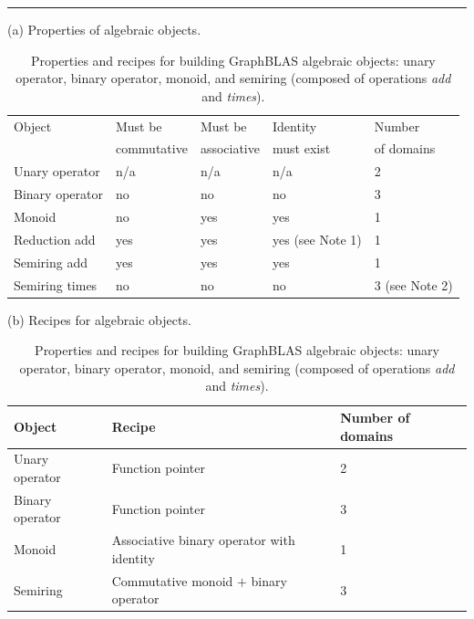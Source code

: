 
\begin{table}
    \hrule
    \begin{center}
        \caption{Properties and recipes for building GraphBLAS algebraic objects: unary operator, binary operator, monoid, and semiring (composed of operations \emph{add} and \emph{times}).}
        \label{Tab:AlgebraicObjects}
        
        \vspace{1\baselineskip}
        (a) Properties of algebraic objects.
        \vspace{1\baselineskip}
        
        \begin{tabular}{l|l|l|l|l}
            Object          & Must be       & Must be        & Identity         & Number \\
                            & commutative   & associative    & must exist       & of domains  \\
            \hline
            Unary operator  & n/a           & n/a            & n/a              & 2  \\
            Binary operator & no            & no             & no               & 3  \\
            Monoid          & no            & yes            & yes              & 1  \\
            Reduction add   & yes           & yes            & yes (see Note 1) & 1  \\
            Semiring add    & yes           & yes            & yes              & 1  \\
            Semiring times  & no            & no             & no               & 3  (see Note 2) \\
        \end{tabular}
        
        \vspace{1\baselineskip}
        (b) Recipes for algebraic objects.
        \vspace{1\baselineskip}
        
        \begin{tabular}{l|l|l}
            Object          & Recipe                                        & Number of domains \\
            \hline
            Unary operator  & Function pointer                              & 2 \\
            Binary operator & Function pointer                              & 3 \\
            Monoid          & Associative binary operator with identity     & 1 \\
            Semiring        & Commutative monoid $+$ binary operator        & 3 \\
        \end{tabular}
        

\end{center}
\end{table}
